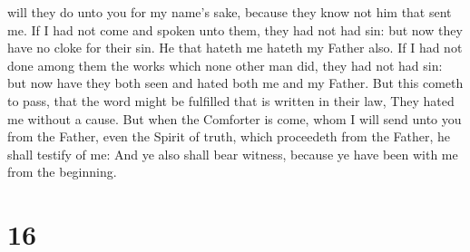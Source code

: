 will they do unto you for my name's sake, because they know not him that
sent me.  If I had not come and spoken unto them, they
had not had sin: but now they have no cloke for their sin.
 He that hateth me hateth my Father also. 
If I had not done among them the works which none other man did, they
had not had sin: but now have they both seen and hated both me and my
Father.  But this cometh to pass, that the word might be
fulfilled that is written in their law, They hated me without a cause.
 But when the Comforter is come, whom I will send unto
you from the Father, even the Spirit of truth, which proceedeth from the
Father, he shall testify of me:  And ye also shall bear
witness, because ye have been with me from the beginning.

\hypertarget{section-15}{%
\section{16}\label{section-15}}

